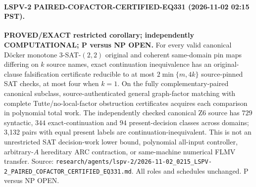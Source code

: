 \paragraph{LSPV-2 PAIRED-COFACTOR-CERTIFIED-EQ331 (2026-11-02 02:15 PST).}
\textbf{PROVED/EXACT restricted corollary; independently COMPUTATIONAL; P versus NP OPEN.}
For every valid canonical D\"ocker monotone $3$-SAT-$(2,2)$ original and coherent same-domain pin maps differing on $k$ source names, exact continuation inequivalence has an original-clause falsification certificate reducible to at most $2\min\{m,4k\}$ source-pinned SAT checks, at most four when $k=1$. On the fully complementary-paired canonical subclass, source-authenticated general graph-factor matching with complete Tutte/no-local-factor obstruction certificates acquires each comparison in polynomial total work. The independently checked canonical Z6 source has $729$ syntactic, $344$ exact-continuation and $94$ present-decision classes across domains; 3,132 pairs with equal present labels are continuation-inequivalent. This is not an unrestricted SAT decision-work lower bound, polynomial all-input controller, arbitrary-$A$ hereditary ARC contraction, or same-machine numerical FLMV transfer. Source: \texttt{research/agents/lspv-2/2026-11-02\_0215\_LSPV-2\_PAIRED\_COFACTOR\_CERTIFIED\_EQ331.md}. All roles and schedules unchanged. P versus NP OPEN.
